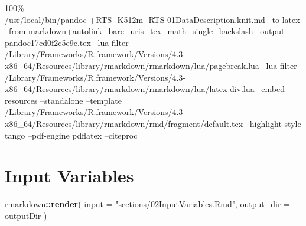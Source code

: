 \documentclass[
]{article}
\newenvironment{Shaded}{\begin{snugshade}}{\end{snugshade}}
\newcommand{\AttributeTok}[1]{\textcolor[rgb]{0.13,0.29,0.53}{#1}}
\newcommand{\FunctionTok}[1]{\textcolor[rgb]{0.13,0.29,0.53}{\textbf{#1}}}
\newcommand{\NormalTok}[1]{#1}
\newcommand{\SpecialCharTok}[1]{\textcolor[rgb]{0.81,0.36,0.00}{\textbf{#1}}}
\newcommand{\StringTok}[1]{\textcolor[rgb]{0.31,0.60,0.02}{#1}}
\begin{document}
100\%\\
/usr/local/bin/pandoc +RTS -K512m -RTS 01DataDescription.knit.md --to
latex --from markdown+autolink\_bare\_uris+tex\_math\_single\_backslash
--output pandoc17cd0f2c5e9c.tex --lua-filter
/Library/Frameworks/R.framework/Versions/4.3-x86\_64/Resources/library/rmarkdown/rmarkdown/lua/pagebreak.lua
--lua-filter
/Library/Frameworks/R.framework/Versions/4.3-x86\_64/Resources/library/rmarkdown/rmarkdown/lua/latex-div.lua
--embed-resources --standalone --template
/Library/Frameworks/R.framework/Versions/4.3-x86\_64/Resources/library/rmarkdown/rmd/fragment/default.tex
--highlight-style tango --pdf-engine pdflatex --citeproc

\hypertarget{input-variables}{%
\section{Input Variables}\label{input-variables}}

\begin{Shaded}
\begin{Highlighting}[]
\NormalTok{rmarkdown}\SpecialCharTok{::}\FunctionTok{render}\NormalTok{(}
  \AttributeTok{input =} \StringTok{"sections/02InputVariables.Rmd"}\NormalTok{,}
  \AttributeTok{output\_dir =}\NormalTok{ outputDir}
\NormalTok{)}
\end{Highlighting}
\end{Shaded}
\end{document}

